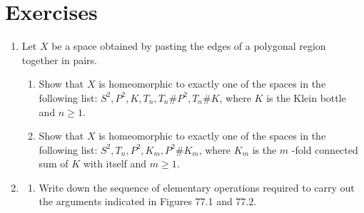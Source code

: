 \section*{Exercises}
\begin{enumerate}[itemsep=0.4em, parsep=0pt, topsep=0pt, partopsep=0pt, leftmargin=*, label=\arabic*., ref=\arabic*]
\item Let \(X\) be a space obtained by pasting the edges of a polygonal region together in pairs.
 \begin{enumerate}[itemsep=0.2em, parsep=0pt, topsep=0pt, partopsep=0pt, leftmargin=*, label=(\alph*), align=left]
 \item Show that \(X\) is homeomorphic to exactly one of the spaces in the following list: \(S^{2},P^{2},K,T_{n},T_{n}\# P^{2},T_{n}\# K\), where \(K\) is the Klein bottle and \(n \geq 1\).
 \item Show that \(X\) is homeomorphic to exactly one of the spaces in the following list: \(S^{2},T_{n},P^{2},K_{m},P^{2}\# K_{m}\), where \(K_{m}\) is the \(m\) -fold connected sum of \(K\) with itself and \(m \geq 1\).
 \end{enumerate}
\item
 \begin{enumerate}[itemsep=0.2em, parsep=0pt, topsep=0pt, partopsep=0pt, leftmargin=*, label=(\alph*), align=left]
 \item Write down the sequence of elementary operations required to carry out the arguments indicated in Figures 77.1 and 77.2.


\end{enumerate}
\end{enumerate}
